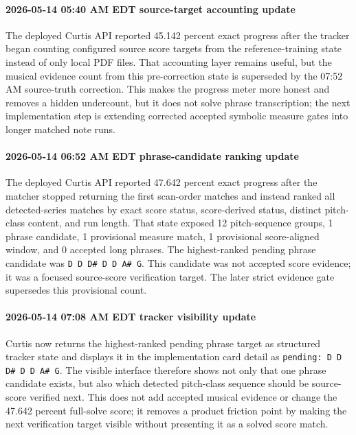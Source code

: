\paragraph{2026-05-14 05:40 AM EDT source-target accounting update} The deployed Curtis API reported 45.142 percent exact progress after the tracker began counting configured source score targets from the reference-training state instead of only local PDF files. That accounting layer remains useful, but the musical evidence count from this pre-correction state is superseded by the 07:52 AM source-truth correction. This makes the progress meter more honest and removes a hidden undercount, but it does not solve phrase transcription; the next implementation step is extending corrected accepted symbolic measure gates into longer matched note runs.
\paragraph{2026-05-14 06:52 AM EDT phrase-candidate ranking update} The deployed Curtis API reported 47.642 percent exact progress after the matcher stopped returning the first scan-order matches and instead ranked all detected-series matches by exact score status, score-derived status, distinct pitch-class content, and run length. That state exposed 12 pitch-sequence groups, 1 phrase candidate, 1 provisional measure match, 1 provisional score-aligned window, and 0 accepted long phrases. The highest-ranked pending phrase candidate was \texttt{D D D\# D D A\# G}. This candidate was not accepted score evidence; it was a focused source-score verification target. The later strict evidence gate supersedes this provisional count.

\paragraph{2026-05-14 07:08 AM EDT tracker visibility update} Curtis now returns the highest-ranked pending phrase target as structured tracker state and displays it in the implementation card detail as \texttt{pending: D D D\# D D A\# G}. The visible interface therefore shows not only that one phrase candidate exists, but also which detected pitch-class sequence should be source-score verified next. This does not add accepted musical evidence or change the 47.642 percent full-solve score; it removes a product friction point by making the next verification target visible without presenting it as a solved score match.

